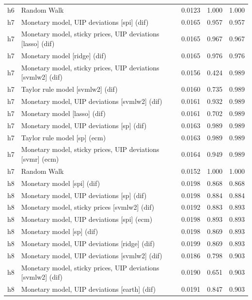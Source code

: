 \begin{ThreePartTable}
\begin{longtable}[t]{cp{5.5cm}ccc}
h6 & \raggedright Random Walk & 0.0123 & 1.000 & 1.000\\
\addlinespace
h7 & \raggedright Monetary model, UIP deviations [spi] (dif) & 0.0165 & 0.957 & 0.957\\
h7 & \raggedright Monetary model, sticky prices, UIP deviations [lasso] (dif) & 0.0165 & 0.967 & 0.967\\
h7 & \raggedright Monetary model [ridge] (dif) & 0.0165 & 0.976 & 0.976\\
h7 & \raggedright Monetary model, sticky prices, UIP deviations [svmlw2] (dif) & 0.0156 & 0.424 & 0.989\\
h7 & \raggedright Taylor rule model [svmlw2] (dif) & 0.0160 & 0.735 & 0.989\\
h7 & \raggedright Monetary model, UIP deviations [svmlw2] (dif) & 0.0161 & 0.932 & 0.989\\
h7 & \raggedright Monetary model [lasso] (dif) & 0.0161 & 0.702 & 0.989\\
h7 & \raggedright Monetary model, UIP deviations [sp] (dif) & 0.0163 & 0.989 & 0.989\\
h7 & \raggedright Taylor rule model [sp] (ecm) & 0.0163 & 0.989 & 0.989\\
h7 & \raggedright Monetary model, sticky prices, UIP deviations [svmr] (ecm) & 0.0164 & 0.949 & 0.989\\
h7 & \raggedright Random Walk & 0.0152 & 1.000 & 1.000\\
\addlinespace
h8 & \raggedright Monetary model [spi] (dif) & 0.0198 & 0.868 & 0.868\\
h8 & \raggedright Monetary model, UIP deviations [sp] (dif) & 0.0198 & 0.884 & 0.884\\
h8 & \raggedright Monetary model, sticky prices [svmlw2] (dif) & 0.0192 & 0.883 & 0.893\\
h8 & \raggedright Monetary model, UIP deviations [spi] (ecm) & 0.0198 & 0.893 & 0.893\\
h8 & \raggedright Monetary model [sp] (dif) & 0.0198 & 0.869 & 0.893\\
h8 & \raggedright Monetary model, UIP deviations [ridge] (dif) & 0.0199 & 0.869 & 0.893\\
h8 & \raggedright Monetary model, UIP deviations [svmlw2] (dif) & 0.0186 & 0.798 & 0.903\\
h8 & \raggedright Monetary model, sticky prices, UIP deviations [svmlw2] (dif) & 0.0190 & 0.651 & 0.903\\
h8 & \raggedright Monetary model, UIP deviations [earth] (dif) & 0.0191 & 0.847 & 0.903\\

\end{longtable}
\end{ThreePartTable}
